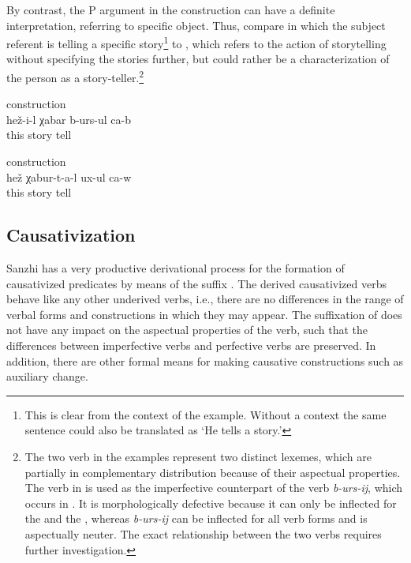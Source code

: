 By contrast, the P argument in the  construction can have a definite interpretation, referring to specific object. Thus, compare  in which the subject referent is telling a specific story\footnote{This is clear from the context of the example. Without a context the same sentence could also be translated as `He tells a story.'} to , which refers to the action of storytelling without specifying the stories further, but could rather be a characterization of the person as a story-teller.\footnote{The two verb in the examples represent two distinct lexemes, which are partially in complementary distribution because of their aspectual properties. The verb in  is used as the imperfective counterpart of the verb \textit{b-urs-ij}, which occurs in . It is morphologically defective because it can only be inflected for the  and the , whereas \textit{b-urs-ij} can be inflected for all verb forms and is aspectually neuter. The exact relationship between the two verbs requires further investigation.} 

\begin{exe}
	\ex	{} construction \label{ex:He tells the story} \\
	\gll	hež-i-l	χabar	b-urs-ul	ca-b\\
		this	story	tell	\\
	\glt	{}

	\ex	{} construction \label{ex:He tells many stories} \\
	\gll	hež	χabur-t-a-l	ux-ul	ca-w\\
		this	story	tell	\\
	\glt	{}
\end{exe}



\subsection{Causativization}\label{sec:Causativization}
\largerpage

Sanzhi has a very productive derivational process for the formation of causativized predicates by means of the suffix . The derived causativized verbs behave like any other underived verbs, i.e., there are no differences in the range of verbal forms and constructions in which they may appear. The suffixation of  does not have any impact on the aspectual properties of the verb, such that the differences between imperfective verbs and perfective verbs are preserved. In addition, there are other formal means for making causative constructions such as auxiliary change.

